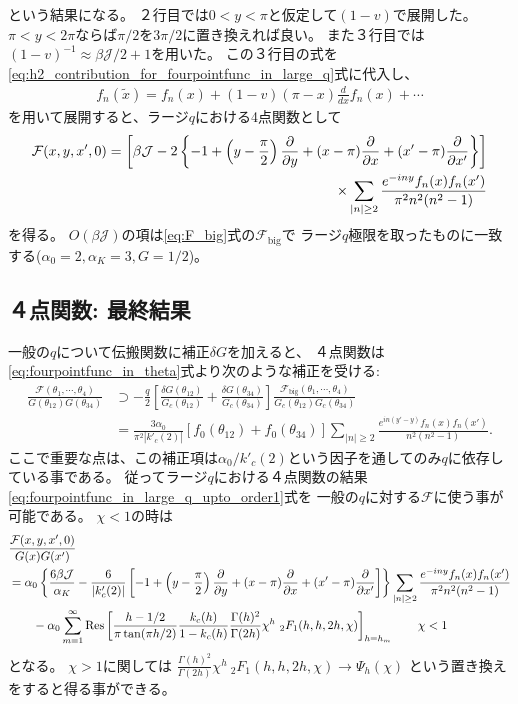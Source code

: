 という結果になる。
２行目では$0 < y < \pi$と仮定して$(1 - v)$で展開した。
$\pi < y < 2\pi$ならば$\pi / 2$を$3\pi / 2$に置き換えれば良い。
また３行目では$(1-v)^{-1}\approx \beta\mathcal{J}/2 + 1$を用いた。
この３行目の式を\eqref{eq:h2_contribution_for_fourpointfunc_in_large_q}式に代入し、
\begin{align}
	f_n(\tilde{x}) = f_n(x) + (1-v)(\pi - x)\frac{d}{dx}f_n(x) + \cdots
\end{align}
を用いて展開すると、ラージ$q$における4点関数として
\begin{align}
	\mathcal{F}(x, y, x', 0)
	= \left[
		\beta\mathcal{J} - 2\left\{-1 + \left(y - \frac{\pi}{2}\right)\frac{\partial}{\partial y}
		+ (x-\pi)\frac{\partial}{\partial x} + (x' - \pi)\frac{\partial}{\partial x'}\right\}
	\right]\nonumber\\
	\times \sum_{|n|\geq 2} \frac{e^{-iny}f_n(x)f_n(x')}{\pi^2n^2(n^2-1)}
	\label{eq:fourpointfunc_in_large_q_upto_order1}
\end{align}
を得る。
$O(\beta\mathcal{J})$の項は\eqref{eq:F_big}式の$\mathcal{F}_{\mathrm{big}}$で
ラージ$q$極限を取ったものに一致する($\alpha_0=2, \alpha_K=3, G=1/2$)。

\subsection{４点関数: 最終結果}
一般の$q$について伝搬関数に補正$\delta G$を加えると、
４点関数は\eqref{eq:fourpointfunc_in_theta}式より次のような補正を受ける:
\begin{align}
	\frac{\mathcal{F}(\theta_1, \cdots, \theta_4)}{G(\theta_{12})G(\theta_{34})}
	&\supset -\frac{q}{2}
		\left[
			\frac{\delta G(\theta_{12})}{G_c(\theta_{12})}
			+ \frac{\delta G(\theta_{34})}{G_c(\theta_{34})}
		\right]
		\frac{\mathcal{F}_{\mathrm{big}}(\theta_1, \cdots, \theta_4)}
			{G_c(\theta_{12})G_c(\theta_{34})}\\
	&= \frac{3\alpha_0}{\pi^2|k'_c(2)|}[f_0(\theta_{12}) + f_0(\theta_{34})]
		\sum_{|n|\geq 2}\frac{e^{in(y'-y)}f_n(x)f_n(x')}{n^2(n^2-1)}.
\end{align}
ここで重要な点は、この補正項は$\alpha_0 / k'_c(2)$という因子を通してのみ$q$に依存している事である。
従ってラージ$q$における４点関数の結果\eqref{eq:fourpointfunc_in_large_q_upto_order1}式を
一般の$q$に対する$\mathcal{F}$に使う事が可能である。
$\chi < 1$の時は
\begin{align}
	&\frac{\mathcal{F}(x,y,x',0)}{G(x)G(x')}\nonumber\\
	&= \alpha_0\left\{
		\frac{6\beta\mathcal{J}}{\alpha_K} - \frac{6}{|k'_c(2)|}
		\left[
			-1 + \left(y-\frac{\pi}{2}\right)\frac{\partial}{\partial y}
			+ (x - \pi)\frac{\partial}{\partial x} + (x' - \pi)\frac{\partial}{\partial x'}
		\right]
	\right\}\sum_{|n|\geq 2}\frac{e^{-iny}f_n(x)f_n(x')}{\pi^2n^2(n^2-1)}\nonumber\\
	&\hspace{20pt}
	-\alpha_0\sum_{m=1}^{\infty}\mathrm{Res}\left[
		\frac{h-1/2}{\pi\tan(\pi h/2)}\frac{k_c(h)}{1-k_c(h)}\frac{\Gamma(h)^2}{\Gamma(2h)}
		\chi^h\ {}_2F_1(h, h, 2h, \chi)
	\right]_{h=h_m}
	\hspace{20pt}\chi < 1
\end{align}
となる。
$\chi > 1$に関しては
$\frac{\Gamma(h)^2}{\Gamma(2h)}\chi^h\ {}_2F_1(h, h, 2h, \chi)\to \Psi_h(\chi)$
という置き換えをすると得る事ができる。


\pagebreak
